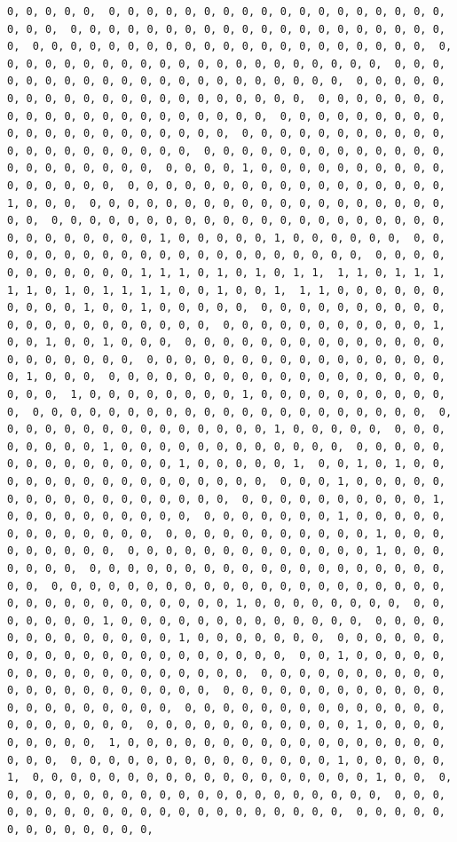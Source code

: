 \documentclass[
]{article}
\begin{document}
\begin{verbatim}
0, 0, 0, 0, 0,  0, 0, 0, 0, 0, 0, 0, 0, 0, 0, 0, 0, 0, 0, 0, 0, 0, 0, 0, 0, 0,  0, 0, 0, 0, 0, 0, 0, 0, 0, 0, 0, 0, 0, 0, 0, 0, 0, 0, 0, 0, 0,  0, 0, 0, 0, 0, 0, 0, 0, 0, 0, 0, 0, 0, 0, 0, 0, 0, 0, 0, 0, 0,  0, 0, 0, 0, 0, 0, 0, 0, 0, 0, 0, 0, 0, 0, 0, 0, 0, 0, 0, 0, 0,  0, 0, 0, 0, 0, 0, 0, 0, 0, 0, 0, 0, 0, 0, 0, 0, 0, 0, 0, 0, 0,  0, 0, 0, 0, 0, 0, 0, 0, 0, 0, 0, 0, 0, 0, 0, 0, 0, 0, 0, 0, 0,  0, 0, 0, 0, 0, 0, 0, 0, 0, 0, 0, 0, 0, 0, 0, 0, 0, 0, 0, 0, 0,  0, 0, 0, 0, 0, 0, 0, 0, 0, 0, 0, 0, 0, 0, 0, 0, 0, 0, 0, 0, 0,  0, 0, 0, 0, 0, 0, 0, 0, 0, 0, 0, 0, 0, 0, 0, 0, 0, 0, 0, 0, 0,  0, 0, 0, 0, 0, 0, 0, 0, 0, 0, 0, 0, 0, 0, 0, 0, 0, 0, 0, 0, 0,  0, 0, 0, 0, 1, 0, 0, 0, 0, 0, 0, 0, 0, 0, 0, 0, 0, 0, 0, 0, 0,  0, 0, 0, 0, 0, 0, 0, 0, 0, 0, 0, 0, 0, 0, 0, 0, 0, 1, 0, 0, 0,  0, 0, 0, 0, 0, 0, 0, 0, 0, 0, 0, 0, 0, 0, 0, 0, 0, 0, 0, 0, 0,  0, 0, 0, 0, 0, 0, 0, 0, 0, 0, 0, 0, 0, 0, 0, 0, 0, 0, 0, 0, 0,  0, 0, 0, 0, 0, 0, 0, 0, 1, 0, 0, 0, 0, 0, 1, 0, 0, 0, 0, 0, 0,  0, 0, 0, 0, 0, 0, 0, 0, 0, 0, 0, 0, 0, 0, 0, 0, 0, 0, 0, 0, 0,  0, 0, 0, 0, 0, 0, 0, 0, 0, 0, 0, 1, 1, 1, 0, 1, 0, 1, 0, 1, 1,  1, 1, 0, 1, 1, 1, 1, 1, 0, 1, 0, 1, 1, 1, 1, 0, 0, 1, 0, 0, 1,  1, 1, 0, 0, 0, 0, 0, 0, 0, 0, 0, 0, 1, 0, 0, 1, 0, 0, 0, 0, 0,  0, 0, 0, 0, 0, 0, 0, 0, 0, 0, 0, 0, 0, 0, 0, 0, 0, 0, 0, 0, 0,  0, 0, 0, 0, 0, 0, 0, 0, 0, 0, 0, 1, 0, 0, 1, 0, 0, 1, 0, 0, 0,  0, 0, 0, 0, 0, 0, 0, 0, 0, 0, 0, 0, 0, 0, 0, 0, 0, 0, 0, 0, 0,  0, 0, 0, 0, 0, 0, 0, 0, 0, 0, 0, 0, 0, 0, 0, 0, 0, 1, 0, 0, 0,  0, 0, 0, 0, 0, 0, 0, 0, 0, 0, 0, 0, 0, 0, 0, 0, 0, 0, 0, 0, 0,  1, 0, 0, 0, 0, 0, 0, 0, 0, 1, 0, 0, 0, 0, 0, 0, 0, 0, 0, 0, 0,  0, 0, 0, 0, 0, 0, 0, 0, 0, 0, 0, 0, 0, 0, 0, 0, 0, 0, 0, 0, 0,  0, 0, 0, 0, 0, 0, 0, 0, 0, 0, 0, 0, 0, 0, 0, 1, 0, 0, 0, 0, 0,  0, 0, 0, 0, 0, 0, 0, 0, 1, 0, 0, 0, 0, 0, 0, 0, 0, 0, 0, 0, 0,  0, 0, 0, 0, 0, 0, 0, 0, 0, 0, 0, 0, 0, 0, 1, 0, 0, 0, 0, 0, 1,  0, 0, 1, 0, 1, 0, 0, 0, 0, 0, 0, 0, 0, 0, 0, 0, 0, 0, 0, 0, 0,  0, 0, 0, 1, 0, 0, 0, 0, 0, 0, 0, 0, 0, 0, 0, 0, 0, 0, 0, 0, 0,  0, 0, 0, 0, 0, 0, 0, 0, 0, 0, 1, 0, 0, 0, 0, 0, 0, 0, 0, 0, 0,  0, 0, 0, 0, 0, 0, 0, 1, 0, 0, 0, 0, 0, 0, 0, 0, 0, 0, 0, 0, 0,  0, 0, 0, 0, 0, 0, 0, 0, 0, 0, 0, 1, 0, 0, 0, 0, 0, 0, 0, 0, 0,  0, 0, 0, 0, 0, 0, 0, 0, 0, 0, 0, 0, 0, 1, 0, 0, 0, 0, 0, 0, 0,  0, 0, 0, 0, 0, 0, 0, 0, 0, 0, 0, 0, 0, 0, 0, 0, 0, 0, 0, 0, 0,  0, 0, 0, 0, 0, 0, 0, 0, 0, 0, 0, 0, 0, 0, 0, 0, 0, 0, 0, 0, 0,  0, 0, 0, 0, 0, 0, 0, 0, 0, 0, 0, 0, 1, 0, 0, 0, 0, 0, 0, 0, 0,  0, 0, 0, 0, 0, 0, 0, 1, 0, 0, 0, 0, 0, 0, 0, 0, 0, 0, 0, 0, 0,  0, 0, 0, 0, 0, 0, 0, 0, 0, 0, 0, 0, 0, 1, 0, 0, 0, 0, 0, 0, 0,  0, 0, 0, 0, 0, 0, 0, 0, 0, 0, 0, 0, 0, 0, 0, 0, 0, 0, 0, 0, 0,  0, 0, 1, 0, 0, 0, 0, 0, 0, 0, 0, 0, 0, 0, 0, 0, 0, 0, 0, 0, 0,  0, 0, 0, 0, 0, 0, 0, 0, 0, 0, 0, 0, 0, 0, 0, 0, 0, 0, 0, 0, 0,  0, 0, 0, 0, 0, 0, 0, 0, 0, 0, 0, 0, 0, 0, 0, 0, 0, 0, 0, 0, 0,  0, 0, 0, 0, 0, 0, 0, 0, 0, 0, 0, 0, 0, 0, 0, 0, 0, 0, 0, 0, 0,  0, 0, 0, 0, 0, 0, 0, 0, 0, 0, 0, 1, 0, 0, 0, 0, 0, 0, 0, 0, 0,  1, 0, 0, 0, 0, 0, 0, 0, 0, 0, 0, 0, 0, 0, 0, 0, 0, 0, 0, 0, 0,  0, 0, 0, 0, 0, 0, 0, 0, 0, 0, 0, 0, 0, 0, 1, 0, 0, 0, 0, 0, 1,  0, 0, 0, 0, 0, 0, 0, 0, 0, 0, 0, 0, 0, 0, 0, 0, 0, 0, 1, 0, 0,  0, 0, 0, 0, 0, 0, 0, 0, 0, 0, 0, 0, 0, 0, 0, 0, 0, 0, 0, 0, 0,  0, 0, 0, 0, 0, 0, 0, 0, 0, 0, 0, 0, 0, 0, 0, 0, 0, 0, 0, 0, 0,  0, 0, 0, 0, 0, 0, 0, 0, 0, 0, 0, 0, 0, 
\end{verbatim}
\end{document}
